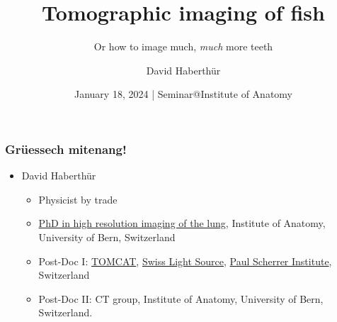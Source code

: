 \documentclass[aspectratio=169]{beamer}
\title{Tomographic imaging of fish}
\subtitle{Or how to image much, \emph{much} more teeth}
\author{David Haberthür}
\institute{Institute of Anatomy\\Universität Bern}
\date{January 18, 2024 | Seminar@Institute of Anatomy}
\newcommand{\uct}{{\textmu}CT\xspace}%
\begin{document}
{%
	\begin{frame}[noframenumbering]
		\maketitle
	\end{frame}%
}

%
%

\begin{frame}
	\frametitle{Grüessech mitenang!}
	\begin{itemize}
		\item David Haberthür
		\begin{itemize}
			\item Physicist by trade
			\item \href{https://boris.unibe.ch/2619/}{PhD in high resolution imaging of the lung}, Institute of Anatomy, University of Bern, Switzerland
			\item Post-Doc I: \href{https://www.psi.ch/sls/tomcat/}{TOMCAT}, \href{https://www.psi.ch/sls/}{Swiss Light Source}, \href{https://www.psi.ch/}{Paul Scherrer Institute}, Switzerland
			\item Post-Doc II: \uct{} group, Institute of Anatomy, University of Bern, Switzerland.
		\end{itemize}
	\end{itemize}
\end{frame}
\end{document}

